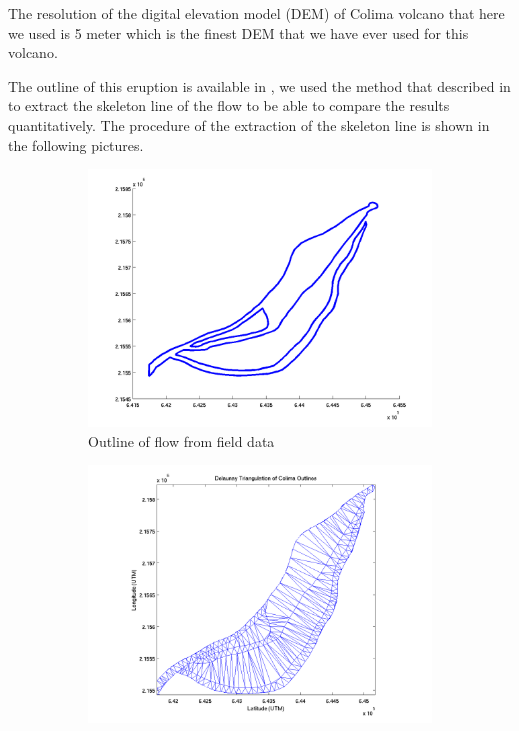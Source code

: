 \documentclass[letterpaper,10pt]{article}
\begin{document}
The resolution of the digital elevation model (DEM) of Colima volcano that here we used is 5 meter which is the finest DEM 
that we have ever used for this volcano.

The outline of this eruption is available in \cite{NamikawaPhD}, we used the method that described in \cite{NamikawaPhD} to 
extract the skeleton line of the flow to be able to compare the results quantitatively. The procedure of the extraction of the 
skeleton line is shown in the following pictures. 

\begin{figure}
        \centering
        \begin{subfigure}[b]{0.45\textwidth}
                \includegraphics[width=\textwidth]{IMAGES/pics/outline.png}
                \caption{Outline of flow from field data}
                \label{fig:Outline}
        \end{subfigure}%
        \begin{subfigure}[b]{0.45\textwidth}
                \includegraphics[width=\textwidth]{IMAGES/pics/Delaunay_Triangulation_of_Colima_clean.png}

\end{subfigure}
\end{figure}
\end{document}
